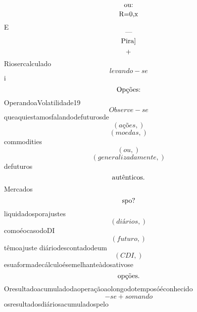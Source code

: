 \documentclass{article}
\begin{document}
\begin{equation}
$ou:$
\end{equation}\begin{equation}
$R=0,x$
\end{equation}E\begin{equation}
—
\end{equation}\begin{equation}
$Pira]$
\end{equation}\begin{equation}
$+$
\end{equation}Riosercalculado\begin{equation}
levando - se
\end{equation}i\begin{equation}
$Opções:$
\end{equation}OperandoaVolatilidade19\begin{equation}
Observe - se
\end{equation}queaquiestamosfalandodefuturosde\begin{equation}
\left( ações,\right)
\end{equation}\begin{equation}
\left( moedas,\right)
\end{equation}commodities\begin{equation}
\left( ou,\right)
\end{equation}\begin{equation}
\left( generalizadamente,\right)
\end{equation}defuturos\begin{equation}
$autênticos.$
\end{equation}Mercados\begin{equation}
$spo?$
\end{equation}liquidadosporajustes\begin{equation}
\left( diários,\right)
\end{equation}comoéocasodoDI\begin{equation}
\left( futuro,\right)
\end{equation}têmoajuste diáriodescontadodeum\begin{equation}
\left( CDI,\right)
\end{equation}esuaformadecálculoésemelhanteàdosativose\begin{equation}
$opções.$
\end{equation}Oresultadoacumuladodaoperaçãoaolongodotemposóéconhecido\begin{equation}
- se + somando
\end{equation}osresultadosdiáriosacumuladospelo\begin{equation}

\end{equation}
\end{document}
